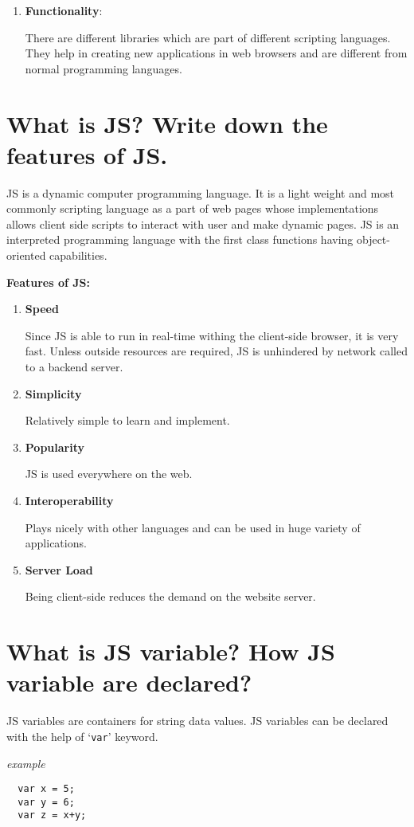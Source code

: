 \documentclass[14pt]{article}
\begin{document}
{\begin{enumerate}
  \item \textbf{Functionality}:

    There are different libraries which are part of different scripting languages.
    They help in creating new applications in web browsers and are different from normal programming languages.
\end{enumerate}

\section{What is JS?  Write down the features of JS.}
JS is a dynamic computer programming language. It is a light weight and most commonly scripting language as a part of web pages whose implementations allows client side scripts to interact with user and make dynamic pages. JS is an interpreted programming language with the first
class functions having object-oriented capabilities.

\textbf{Features of JS:}
\begin{enumerate}
  \item \textbf{Speed}

    Since JS is able to run in real-time withing the client-side browser, it is very fast. Unless outside resources are required, JS is unhindered by network called to a backend server.
  \item \textbf{Simplicity}

    Relatively simple to learn and implement.
  \item \textbf{Popularity}

    JS is used everywhere on the web.
  \item \textbf{Interoperability}

    Plays nicely with other languages and can be used in huge variety of applications.
  \item \textbf{Server Load}

    Being client-side reduces the demand on the website server.
\end{enumerate}
\section{What is JS variable? How JS variable are declared?}
JS variables are containers for string data values. JS variables can be declared with the help of `\texttt{var}' keyword.

\textit{example}
\begin{verbatim}
  var x = 5;
  var y = 6;
  var z = x+y;
\end{verbatim}
}
\end{document}

